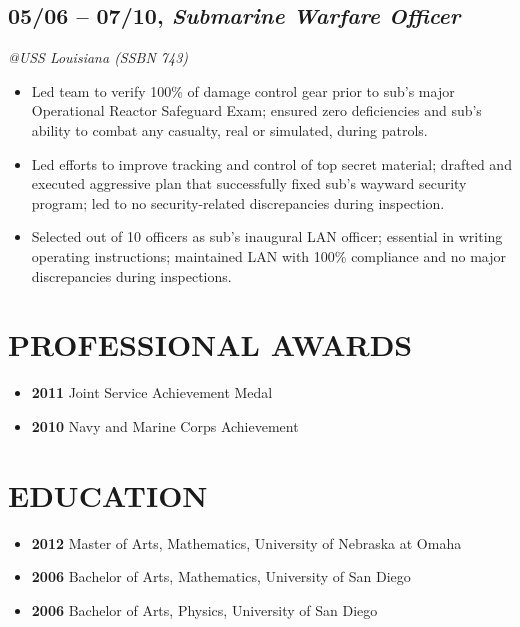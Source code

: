 \documentclass[10pt]{article}
\begin{document}
\subsection{05/06 -- 07/10, \textbf{\emph{Submarine Warfare
Officer}}}\label{submarine-warfare-officer}

\emph{@USS Louisiana (SSBN 743)}

\begin{itemize}
\itemsep1pt\parskip0pt
\item
  Led team to verify 100\% of damage control gear prior to sub's major
  Operational Reactor Safeguard Exam; ensured zero deficiencies and
  sub's ability to combat any casualty, real or simulated, during
  patrols.
\item
  Led efforts to improve tracking and control of top secret material;
  drafted and executed aggressive plan that successfully fixed sub's
  wayward security program; led to no security-related discrepancies
  during inspection.
\item
  Selected out of 10 officers as sub's inaugural LAN officer; essential
  in writing operating instructions; maintained LAN with 100\%
  compliance and no major discrepancies during inspections.
\end{itemize}

\section{PROFESSIONAL AWARDS}\label{professional-awards}

\begin{itemize}
\itemsep1pt\parskip0pt
\item
  \textbf{2011} Joint Service Achievement Medal
\item
  \textbf{2010} Navy and Marine Corps Achievement
\end{itemize}

\section{EDUCATION}\label{education}

\begin{itemize}
\itemsep1pt\parskip0pt
\item
  \textbf{2012} Master of Arts, Mathematics, University of Nebraska at
  Omaha
\item
  \textbf{2006} Bachelor of Arts, Mathematics, University of San Diego
\item
  \textbf{2006} Bachelor of Arts, Physics, University of San Diego
\end{itemize}
\end{document}
